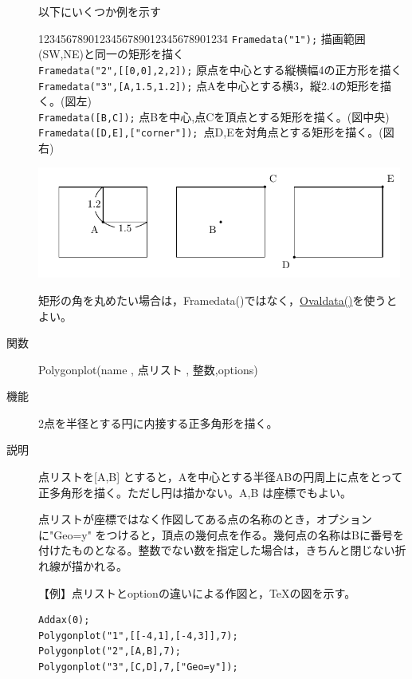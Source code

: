 \documentclass[papersize,a4paper,10pt,uplatex]{jsarticle}
\begin{document}
\begin{description}
以下にいくつか例を示す
\begin{tabbing}
1234567890123456789012345678901234\=\kill
\verb|Framedata("1");|\> 描画範囲(SW,NE)と同一の矩形を描く\\
\verb|Framedata("2",[[0,0],2,2]);| \> 原点を中心とする縦横幅4の正方形を描く\\
\verb|Framedata("3",[A,1.5,1.2]);|\> 点Aを中心とする横3，縦2.4の矩形を描く。(図左)\\
\verb|Framedata([B,C]);|\> 点Bを中心,点Cを頂点とする矩形を描く。(図中央)\\
\verb|Framedata([D,E],["corner"]); |\>点D,Eを対角点とする矩形を描く。(図右)
 \end{tabbing}
\begin{center}\includegraphics[bb=0.00 0.00 348.15 106.16,width=12cm]{Fig/Framedata.pdf}\end{center}

矩形の角を丸めたい場合は，Framedata()ではなく，\hyperlink{ovaldata}{Ovaldata()}を使うとよい。
 
\vspace{\baselineskip}
\hypertarget{polygonplot}{}
\item[関数]Polygonplot(name , 点リスト , 整数,options)
\item[機能]2点を半径とする円に内接する正多角形を描く。
\item[説明]点リストを[A,B] とすると，Aを中心とする半径ABの円周上に点をとって正多角形を描く。ただし円は描かない。A,B は座標でもよい。

点リストが座標ではなく作図してある点の名称のとき，オプションに"Geo=y" をつけると，頂点の幾何点を作る。幾何点の名称はBに番号を付けたものとなる。整数でない数を指定した場合は，きちんと閉じない折れ線が描かれる。

\vspace{\baselineskip}
【例】点リストとoptionの違いによる作図と，TeXの図を示す。

\begin{verbatim}
Addax(0);
Polygonplot("1",[[-4,1],[-4,3]],7);
Polygonplot("2",[A,B],7);
Polygonplot("3",[C,D],7,["Geo=y"]);
\end{verbatim}


\end{description}
\end{document}
